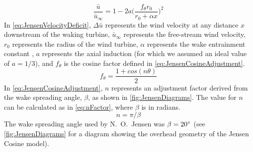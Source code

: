 \documentclass[a4paper]{jpconf}
\begin{document}
\begin{equation}
    \frac{ \bar{u}}{\bar{u}_\infty} = 1 - 2a \bigg(\frac{f_\theta r_0}{r_0 + \alpha x} \bigg)^2
    \label{eq:JensenVelocityDeficit}
\end{equation}
%
In \cref{eq:JensenVelocityDeficit}, $\Delta \bar{u}$ represents the wind velocity at any distance $x$ downstream of the waking turbine, $\bar{u}_\infty$ represents the free-stream wind velocity, $r_0$ represents the radius of the wind turbine, $\alpha$ represents the wake entrainment constant \cite{jensen1983}, $a$ represents the axial induction (for which we assumed an ideal value of $a = 1/3$), and $f_\theta$ is the cosine factor defined in \cref{eq:JensenCosineAdjustment}.
%
\begin{equation}
f_\theta = \frac{1 + cos(n\theta)}{2}
\label{eq:JensenCosineAdjustment}
\end{equation}
%
In \cref{eq:JensenCosineAdjustment}, $n$ represents an adjustment factor derived from the wake spreading angle, $\beta$, as shown in \cref{fig:JensenDiagrams}. The value for $n$ can be calculated as in \cref{eq:nFactor}, where $\beta$ is in radians.
%
\begin{equation}
n = \pi / \beta
\label{eq:nFactor}
\end{equation}
%
The wake spreading angle used by N.~O.~Jensen was $\beta = 20 \degree$  \cite{jensen1983} (see \cref{fig:JensenDiagrams} for a diagram showing the overhead geometry of the Jensen Cosine model).


\end{document}
